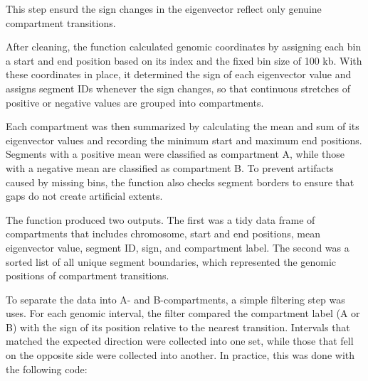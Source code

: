\documentclass[
  a4paper,
  openany]{scrbook}
\begin{document}
This step ensurd the sign changes in the eigenvector reflect only
genuine compartment transitions.

After cleaning, the function calculated genomic coordinates by assigning
each bin a start and end position based on its index and the fixed bin
size of 100 kb. With these coordinates in place, it determined the sign
of each eigenvector value and assigns segment IDs whenever the sign
changes, so that continuous stretches of positive or negative values are
grouped into compartments.

Each compartment was then summarized by calculating the mean and sum of
its eigenvector values and recording the minimum start and maximum end
positions. Segments with a positive mean were classified as compartment
A, while those with a negative mean are classified as compartment B. To
prevent artifacts caused by missing bins, the function also checks
segment borders to ensure that gaps do not create artificial extents.

The function produced two outputs. The first was a tidy data frame of
compartments that includes chromosome, start and end positions, mean
eigenvector value, segment ID, sign, and compartment label. The second
was a sorted list of all unique segment boundaries, which represented
the genomic positions of compartment transitions.

To separate the data into A- and B-compartments, a simple filtering step
was uses. For each genomic interval, the filter compared the compartment
label (A or B) with the sign of its position relative to the nearest
transition. Intervals that matched the expected direction were collected
into one set, while those that fell on the opposite side were collected
into another. In practice, this was done with the following code:
\end{document}
